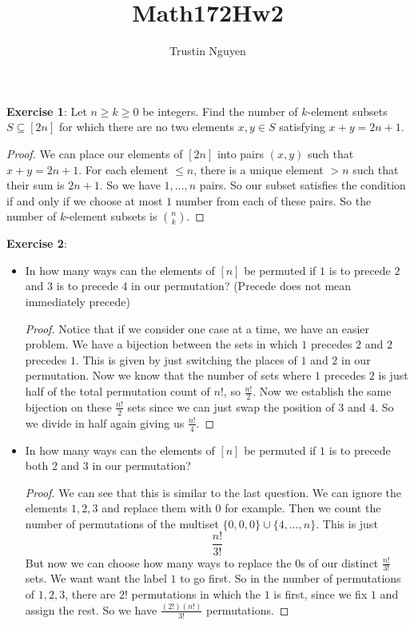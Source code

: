 \documentclass{article}
\title{Math172Hw2}
\author{Trustin Nguyen}
\begin{document}
    \maketitle

\reversemarginpar

\textbf{Exercise 1}: Let $n \geq k \geq 0$ be integers. Find the number of $k$-element subsets $S \subseteq [2n]$ for which there are no two elements $x, y \in S$ satisfying $x + y = 2n + 1$.
    \begin{proof}
        We can place our elements of $[2n]$ into pairs $(x, y)$ such that $x + y = 2n + 1$. For each element $\leq  n$, there is a unique element $> n$ such that their sum is $2n + 1$. So we have $1, \ldots, n$ pairs. So our subset satisfies the condition if and only if we choose at most $1$ number from each of these pairs. So the number of $k$-element subsets is $\binom{n}{k}$.
    \end{proof}

\textbf{Exercise 2}: 
    \begin{itemize}
        \item In how many ways can the elements of $[n]$ be permuted if $1$ is to precede $2$ and $3$ is to precede 4 in our permutation? (Precede does not mean immediately precede)
            \begin{proof}
                Notice that if we consider one case at a time, we have an easier problem. We have a bijection between the sets in which $1$ precedes $2$ and $2$ precedes $1$. This is given by just switching the places of $1$ and $2$ in our permutation. Now we know that the number of sets where $1$ precedes $2$ is just half of the total permutation count of $n!$, so $\frac{n!}{2}$. Now we establish the same bijection on these $\frac{n!}{2}$ sets since we can just swap the position of $3$ and $4$. So we divide in half again giving us $\frac{n!}{4}$.
            \end{proof}

        \item In how many ways can the elements of $[n]$ be permuted if $1$ is to precede both $2$ and $3$ in our permutation? 
            \begin{proof}
                We can see that this is similar to the last question. We can ignore the elements $1, 2, 3$ and replace them with $0$ for example. Then we count the number of permutations of the multiset $\{0, 0, 0\} \cup \{4, \ldots, n\}$. This is just
                    \begin{equation*}
                        \dfrac{n!}{3!}
                    \end{equation*}
                But now we can choose how many ways to replace the 0s of our distinct $\frac{n!}{3!}$ sets. We want want the label $1$ to go first. So in the number of permutations of $1, 2, 3$, there are $2!$ permutations in which the $1$ is first, since we fix $1$ and assign the rest. So we have $\frac{(2!)(n!)}{3!}$ permutations.
            \end{proof}
    \end{itemize}
\end{document}
